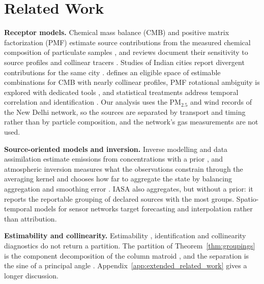 \section{Related Work}
\label{sec:related_work}

\noindent\textbf{Receptor models.}
Chemical mass balance (CMB) and positive matrix factorization (PMF) estimate source
contributions from the measured chemical composition of particulate samples
\citep{watson2002receptor,paatero1994positive,hopke2016review}, and reviews document
their sensitivity to source profiles and collinear tracers
\citep{viana2008source,belis2013critical,belis2019european,mircea2020european,hopke2020global}.
Studies of Indian cities report divergent contributions for the same city
\citep{pant2012critical,karagulian2015contributions}.  \citet{henry1992dealing} defines
an eligible space of estimable combinations for CMB with nearly collinear profiles,
PMF rotational ambiguity is explored with dedicated tools
\citep{paatero2002understanding}, and statistical treatments address temporal
correlation \citep{park2001multivariate} and identification
\citep{jin2025identification}.  Our analysis uses the PM\(_{2.5}\) and wind records of
the New Delhi network, so the sources are separated by transport and timing rather than
by particle composition, and the network's gas measurements are not used.

\noindent\textbf{Source-oriented models and inversion.}
Inverse modelling and data assimilation estimate emissions from concentrations with a
prior \citep{tarantola2005inverse,carrassi2018data}, and atmospheric inversion measures what
the observations constrain through the averaging kernel \citep{rodgers2000inverse} and
chooses how far to aggregate the state by balancing aggregation and smoothing error
\citep{turner2015balancing}.  IASA also aggregates, but without a prior: it reports the
reportable grouping of declared sources with the most groups.
Spatio-temporal models for sensor networks
\citep{li2017diffusion,yu2017spatio,iyer2022modeling,bhardwaj2025comprehensive} target
forecasting and interpolation rather than attribution.

\noindent\textbf{Estimability and collinearity.}
Estimability \citep{searle1971linear}, identification
\citep{rothenberg1971identification,manski2003partial} and collinearity diagnostics
\citep{fox1992generalized,belsley1980regression} do not return a partition.  The
partition of Theorem~\ref{thm:groupings} is the component decomposition of the column
matroid \citep{krogdahl1977dependence,oxley2011matroid}, and the separation is the
sine of a principal angle \citep{bjorck1973numerical}.  Appendix~\ref{app:extended_related_work}
gives a longer discussion.
